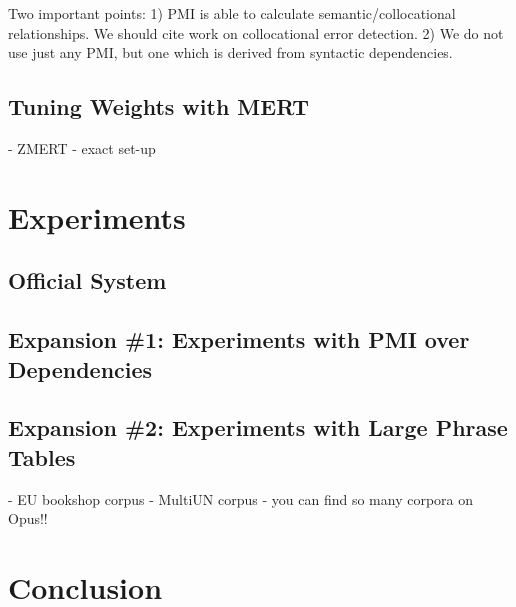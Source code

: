 \documentclass[11pt]{article}
\begin{document}
Two important points: 1) PMI is able to calculate semantic/collocational relationships.  We should cite work on collocational error detection.  2) We do not use just any PMI, but one which is derived from syntactic dependencies.

\subsection{Tuning Weights with MERT}
- ZMERT \cite{zaidan:zmert:09}
- exact set-up

\section{Experiments}

\subsection{Official System}
\cite{nltkbook}

\subsection{Expansion \#1: Experiments with PMI over Dependencies}

\subsection{Expansion \#2: Experiments with Large Phrase Tables}

- EU bookshop corpus
- MultiUN corpus
- you can find so many corpora on Opus!! \cite{tiedemann:12}

\section{Conclusion} 



\end{document}
